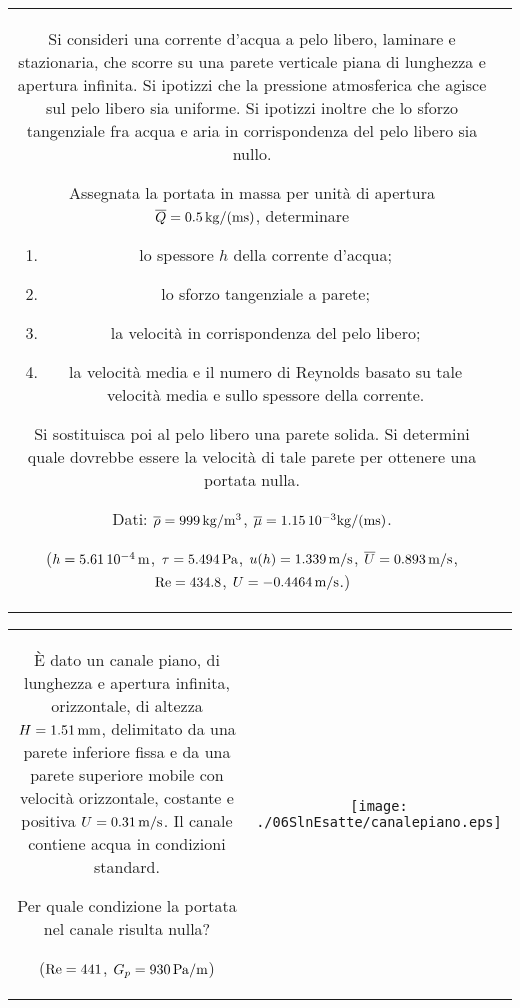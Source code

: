 \noindent
\begin{tabular}{cc}
\begin{minipage}[b]{0.95\textwidth}
\begin{exerciseS}
Si consideri una corrente d'acqua a pelo libero, laminare e stazionaria, che
scorre su una parete verticale piana di lunghezza e apertura infinita.
Si ipotizzi che la pressione atmosferica che agisce sul pelo libero sia
uniforme. Si ipotizzi inoltre che lo sforzo tangenziale fra acqua e aria in
corrispondenza del pelo libero sia nullo.

Assegnata la portata in massa per unit\`a di apertura 
$\overline{Q}=0.5\, {\rm kg/(ms)}$, determinare
\begin{enumerate}
  \item lo spessore $h$ della corrente d'acqua;
  \item lo sforzo tangenziale a parete;
  \item la velocit\`a in corrispondenza del pelo libero;
  \item la velocit\`a media e il numero di Reynolds basato su tale velocit\`a
        media e sullo spessore della corrente.
\end{enumerate}
Si sostituisca poi al pelo libero una parete solida.
Si determini quale dovrebbe essere la velocit\`a di tale parete per ottenere
una portata nulla.

Dati: $\overline{\rho}= 999\, {\rm kg/m^3}$, 
$\overline{\mu}= 1.15\, 10^{-3}{\rm kg/(ms)}$.

($h=5.61\, 10^{-4}\, {\rm m}$, $\tau = 5.494\, {\rm Pa}$, $u(h)=1.339\, {\rm m/s}$,
$\overline{U}=0.893\, {\rm m/s}$, ${\rm Re}=434.8$, $U=-0.4464\, {\rm m/s}$.)
\end{exerciseS}
\end{minipage}
\end{tabular}

\vspace{1cm}

\noindent
\begin{tabular}{cc}
\begin{minipage}[b]{0.60\textwidth}
\begin{exerciseS}
\`E dato un canale piano, di lunghezza e apertura infinita, 
orizzontale, di altezza $H=1.51\,{\rm mm}$,
delimitato da una parete inferiore fissa e da una parete superiore 
mobile con velocit\`a orizzontale, costante e positiva $U=0.31\,{\rm m/s}$.
Il canale contiene acqua in condizioni standard.

Per quale condizione la portata nel canale risulta nulla?


(${\rm Re}=441$, $G_p= 930\, {\rm Pa/m}$)
\end{exerciseS}
\end{minipage}
&
\begin{minipage}[b]{0.35\textwidth}
   \begin{center}
   \texttt{[image: ./06SlnEsatte/canalepiano.eps]}
   \end{center}
\end{minipage}
\end{tabular}

